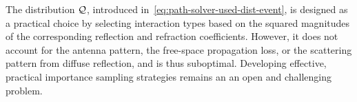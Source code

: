 The distribution ${\cal Q}$, introduced in~\eqref{eq:path-solver-used-dist-event}, is designed as a practical choice by selecting interaction types based on the squared magnitudes of the corresponding reflection and refraction coefficients. However, it does not account for the antenna pattern, the free-space propagation loss, or the scattering pattern from diffuse reflection, and is thus suboptimal. Developing effective, practical importance sampling strategies remains an an open and challenging problem.
